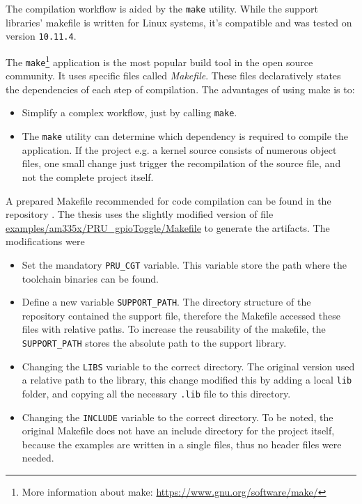 The compilation workflow is aided by the \verb+make+ utility. While the support libraries' makefile is written for Linux systems, it's compatible and was tested on \osx version \verb|10.11.4|.

The \verb+make+\footnote{More information about make: \url{https://www.gnu.org/software/make/}} application is the most popular build tool in the open source community. It uses specific files called \emph{Makefile}. These files declaratively states the dependencies of each step of compilation. The advantages of using make is to:
\begin{itemize}
	\item Simplify a complex workflow, just by calling \verb+make+.
	\item The \verb+make+ utility can determine which dependency is required to compile the application. If the project e.g. a kernel source consists of numerous object files, one small change just trigger the recompilation of the source file, and not the complete project itself.
\end{itemize}

A prepared Makefile recommended for \pru code compilation can be found in the repository \citep{TI_PRUSS_REPO}. The thesis uses the slightly modified version of  file \url{examples/am335x/PRU_gpioToggle/Makefile} to generate the artifacts. The modifications were
\begin{itemize}
	\item Set the mandatory \verb+PRU_CGT+ variable. This variable store the path where the toolchain binaries can be found.
	\item Define a new variable \verb+SUPPORT_PATH+. The directory structure of the repository contained the support file, therefore the Makefile accessed these files with relative paths. To increase the reusability of the makefile, the \verb+SUPPORT_PATH+ stores the absolute path to the support library.
	\item Changing the \verb+LIBS+ variable to the correct directory. The original version used a relative path to the library, this change modified this by adding a local \verb+lib+ folder, and copying all the necessary \verb+.lib+ file to this directory.
	\item Changing the \verb+INCLUDE+ variable to the correct directory. To be noted, the original Makefile does not have an include directory for the project itself, because the examples are written in a single files, thus no header files were needed.
\end{itemize}


